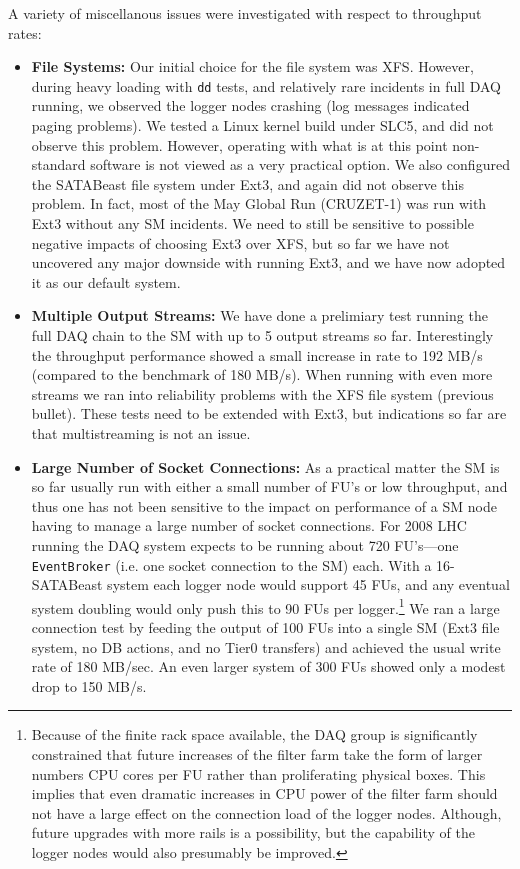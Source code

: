 A variety of miscellanous issues were investigated with respect to throughput rates:
\begin{itemize}
  \item {\bf File Systems:}
Our initial choice for the file system was XFS.
However, during heavy loading with \verb+dd+ tests, and relatively rare incidents 
in full DAQ running,
we observed the logger nodes crashing (log messages indicated paging problems).
We tested a Linux kernel build under SLC5, and did not observe this problem.
However, operating with what is at this point non-standard software is not 
viewed as a very practical option.
We also configured the SATABeast file system under Ext3, and again did not observe
this problem.
In fact, most of the May Global Run (CRUZET-1) was run  with  Ext3
without any SM incidents.
We need to still be sensitive to possible negative impacts of choosing  Ext3 over XFS,
but so far we have not uncovered any major downside with running  Ext3,
and we have now adopted it as our default system.

  \item {\bf Multiple Output Streams:}
We have done a prelimiary test running the full DAQ chain to the SM with 
up to 5 output streams so far.
Interestingly the throughput performance showed a small increase 
in rate to 192 MB/s (compared to the benchmark of 180 MB/s).
When running with even more streams we ran into reliability problems
with the XFS file system (previous bullet).
These tests need to be extended with Ext3, but indications so far are
that multistreaming is not an issue.

 \item {\bf Large Number of Socket Connections:}
As a practical matter the SM is so far usually run with either a small number of FU's 
or  low throughput, and thus  one has  not been sensitive to the impact on performance 
of a SM node having to manage a large number of socket connections.
For 2008 LHC running the DAQ system expects to be running about 720 FU's---one
\verb+EventBroker+ (i.e. one socket connection to the SM) each.
With a 16-SATABeast system each logger node would support 45 FUs,
and any eventual system doubling would only push this 
to 90 FUs per logger.\footnote{Because of the finite rack space available, 
the DAQ group is significantly constrained that future increases of the filter farm take 
the form of larger numbers  CPU cores per FU rather than proliferating physical boxes.
This implies that even dramatic increases in CPU power of the filter farm
should not have a large effect on the connection load of the logger nodes.
Although, future upgrades with more rails is a possibility, but the capability
of the logger nodes would also presumably be improved.}
We ran a large connection test by feeding the output of 100 FUs into
a single SM (Ext3 file system, no DB actions, and no Tier0 transfers) and
achieved the usual write rate of 180 MB/sec.
An even larger system of 300 FUs showed only a modest drop to 150 MB/s.
\end{itemize}


